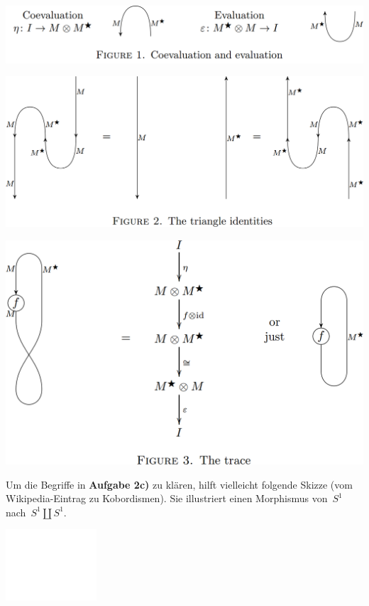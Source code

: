 \documentclass{uebblatt}
\begin{document}
\begin{center}
  \includegraphics[scale=0.3]{images/ponto-shulman-1}

  \includegraphics[scale=0.3]{images/ponto-shulman-2}

  \includegraphics[scale=0.3]{images/ponto-shulman-3}
\end{center}

Um die Begriffe in \textbf{Aufgabe 2c)} zu klären, hilft vielleicht folgende
Skizze (vom Wikipedia-Eintrag zu Kobordismen). Sie illustriert einen Morphismus
von~$S^1$ nach~$S^1 \amalg S^1$.
\begin{center}
  \includegraphics{images/pair-of-pants}
\end{center}
\end{document}
